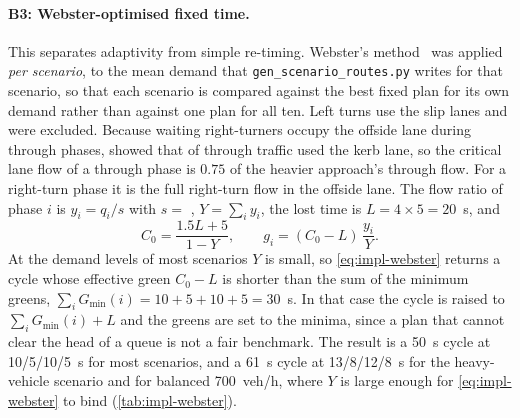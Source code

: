 \paragraph{B3: Webster-optimised fixed time.}  This separates adaptivity from simple re-timing. Webster's
method~\cite{webster1958} was applied \emph{per scenario}, to the mean demand that
\texttt{gen\_scenario\_routes.py} writes for that scenario, so that each scenario is compared against the best
fixed plan for its own demand rather than against one plan for all ten.
Left turns use the slip lanes and were excluded. Because waiting right-turners occupy the offside lane
during through phases, \dtx{} showed that  of through traffic used the kerb lane, so the
critical lane flow of a through phase is $0.75$ of the heavier approach's through flow. For a
right-turn phase it is the full right-turn flow in the offside lane. The flow ratio of phase $i$ is
$y_i = q_i/s$ with $s = $ , $Y = \sum_i y_i$, the lost time is
$L = 4 \times 5 = 20$~s, and
\begin{equation}
  C_0 = \frac{1.5L + 5}{1 - Y}, \qquad g_i = (C_0 - L)\,\frac{y_i}{Y}.
  \label{eq:impl-webster}
\end{equation}
At the demand levels of most scenarios $Y$ is small, so \cref{eq:impl-webster} returns a cycle whose effective
green $C_0 - L$ is shorter than the sum of the minimum greens, $\sum_i G_{\min}(i) = 10+5+10+5 = 30$~s. In
that case the cycle is raised to $\sum_i G_{\min}(i) + L$ and the greens are set to the minima, since a plan
that cannot clear the head of a queue is not a fair benchmark. The result is a 50~s cycle at 10/5/10/5~s for
most scenarios, and a 61~s cycle at 13/8/12/8~s for the heavy-vehicle scenario and for balanced 700~veh/h,
where $Y$ is large enough for \cref{eq:impl-webster} to bind (\cref{tab:impl-webster}).

